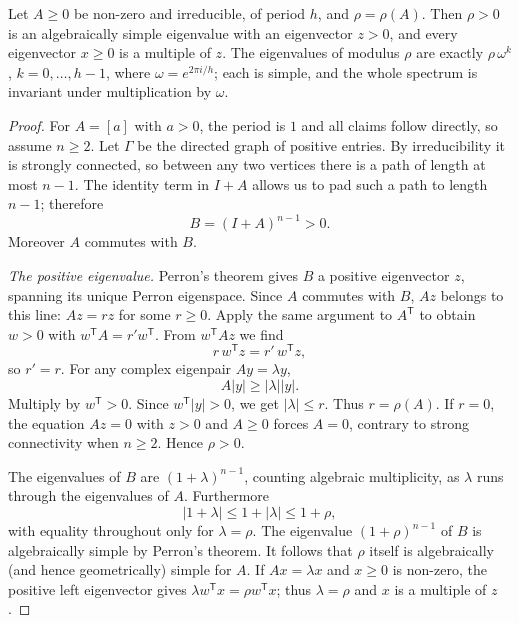 \begin{theorem}[Frobenius, 1912]\label{linear:thm:frobenius}
Let $A\ge0$ be non-zero and irreducible, of period $h$, and $\rho=\rho(A)$. Then $\rho>0$ is an algebraically simple
eigenvalue with an eigenvector $z>0$, and every eigenvector $x\ge0$ is a multiple of $z$. The eigenvalues of modulus $\rho$ are
exactly $\rho\,\omega^k$, $k=0,\dots,h-1$, where $\omega=e^{2\pi i/h}$; each is simple, and the whole spectrum is invariant under
multiplication by $\omega$.
\end{theorem}
\begin{proof}
For $A=[a]$ with $a>0$, the period is $1$ and all claims follow directly, so
assume $n\ge2$. Let $\Gamma$ be the
directed graph of positive entries.
By irreducibility it is strongly connected,
so between any two vertices there is
a path of length at most $n-1$.
The identity term in $I+A$ allows us to
pad such a path to length $n-1$;
therefore
\[
B=(I+A)^{n-1}>0.
\]
Moreover $A$ commutes with $B$.

\emph{The positive eigenvalue.}
Perron's theorem gives $B$ a positive
eigenvector $z$, spanning its unique
Perron eigenspace. Since $A$ commutes
with $B$, $Az$ belongs to this line:
$Az=rz$ for some $r\ge0$.
Apply the same argument to $A^{\mathsf T}$
to obtain $w>0$ with
$w^{\mathsf T}A=r'w^{\mathsf T}$.
From $w^{\mathsf T}Az$ we find
\[
r\,w^{\mathsf T}z=r'\,w^{\mathsf T}z,
\]
so $r'=r$. For any complex eigenpair
$Ay=\lambda y$,
\[
A|y|\ge|\lambda||y|.
\]
Multiply by $w^{\mathsf T}>0$.
Since $w^{\mathsf T}|y|>0$, we get
$|\lambda|\le r$. Thus $r=\rho(A)$.
If $r=0$, the equation $Az=0$ with
$z>0$ and $A\ge0$ forces $A=0$,
contrary to strong connectivity
when $n\ge2$. Hence $\rho>0$.

The eigenvalues of $B$ are
$(1+\lambda)^{n-1}$, counting
algebraic multiplicity, as $\lambda$
runs through the eigenvalues of $A$.
Furthermore
\[
|1+\lambda|\le1+|\lambda|\le1+\rho,
\]
with equality throughout only for
$\lambda=\rho$. The eigenvalue
$(1+\rho)^{n-1}$ of $B$ is
algebraically simple by Perron's theorem.
It follows that $\rho$ itself is
algebraically (and hence geometrically)
simple for $A$.
If $Ax=\lambda x$ and $x\ge0$ is non-zero,
the positive left eigenvector gives
$\lambda w^{\mathsf T}x
=\rho w^{\mathsf T}x$; thus
$\lambda=\rho$ and $x$ is a multiple
of $z$.


\end{proof}
